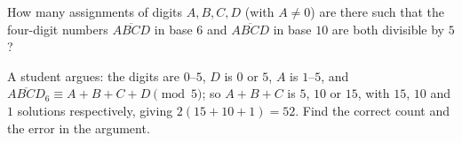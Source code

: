 How many assignments of digits $A,B,C,D$ (with $A\ne0$) are there such that the four-digit numbers $\overline{ABCD}$ in base $6$ and $\overline{ABCD}$ in base $10$ are both divisible by $5$?

A student argues: the digits are $0$--$5$, $D$ is $0$ or $5$, $A$ is $1$--$5$, and $\overline{ABCD}_6\equiv A+B+C+D\pmod 5$; so $A+B+C$ is $5$, $10$ or $15$, with $15$, $10$ and $1$ solutions respectively, giving $2(15+10+1)=52$. Find the correct count and the error in the argument.
